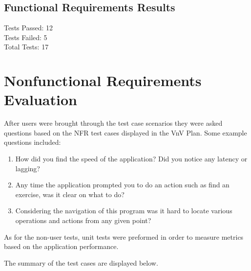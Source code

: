 \documentclass[12pt, titlepage]{article}
\begin{document}
\subsection{Functional Requirements Results}

Tests Passed: 12\\
Tests Failed: 5\\
Total Tests: 17\\

\section{Nonfunctional Requirements Evaluation}

\noindent After users were brought through the test case scenarios they were asked questions based on the NFR test cases displayed in the VnV Plan.
Some example questions included: \\
\begin{enumerate}
	\item How did you find the speed of the application? Did you notice any latency or lagging?
	\item Any time the application prompted you to do an action such as find an exercise, was it clear on what to do?
	\item Considering the navigation of this program was it hard to locate various operations and actions from any given point?
\end{enumerate}

\noindent As for the non-user tests, unit tests were preformed in order to measure metrics based on the application performance.

\noindent The summary of the test cases are displayed below.
\end{document}
